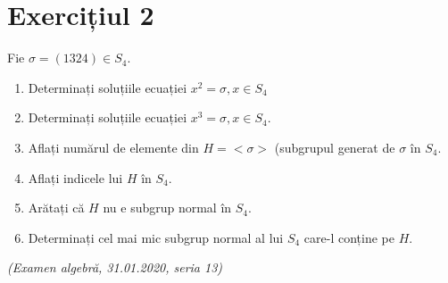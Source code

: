 \documentclass{article}
\begin{document}
\section{Exercițiul 2}
Fie $\sigma = (1 3 2 4) \in S_4$.
\begin{enumerate}
    \item Determinați soluțiile ecuației $x^2 = \sigma, x \in S_4$
    \item Determinați soluțiile ecuației $x^3 = \sigma, x \in S_4$.
    \item Aflați numărul de elemente din $H = <\sigma>$ (subgrupul generat de $\sigma$ în $S_4$.
    \item Aflați indicele lui $H$ în $S_4$.
    \item Arătați că $H$ nu e subgrup normal în $S_4$.
    \item Determinați cel mai mic subgrup normal al lui $S_4$ care-l conține pe $H$.
\end{enumerate}
\emph{(Examen algebră, 31.01.2020, seria 13)}
\end{document}
